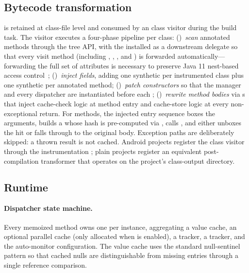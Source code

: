 \subsection{Bytecode transformation}\label{sec:transform}

 is retained at class-file level and consumed by an \asm class visitor during the  build task. The visitor executes a four-phase pipeline per class: ()~\emph{scan} annotated methods through the \asm tree API, with the  installed as a downstream delegate so that every visit method (including , , , and ) is forwarded automatically---forwarding the full set of attributes is necessary to preserve Java 11 nest-based access control~\cite{jep181}; ()~\emph{inject fields}, adding one synthetic  per instrumented class plus one synthetic  per annotated method; ()~\emph{patch constructors} so that the manager and every dispatcher are instantiated before each ; ()~\emph{rewrite method bodies} via s that inject cache-check logic at method entry and cache-store logic at every non-exceptional return. For  methods, the injected entry sequence boxes the arguments, builds a  whose hash is pre-computed via , calls , and either unboxes the hit or falls through to the original body. Exception paths are deliberately skipped: a thrown result is not cached. Android projects register the class visitor through the \agp instrumentation \api; plain \jvm projects register an equivalent post-compilation transformer that operates on the project's class-output directory.

\subsection{Runtime}\label{sec:runtime}

\paragraph{Dispatcher state machine.} Every memoized method owns one  per instance, aggregating a value cache, an optional parallel  cache (only allocated when \ttl is enabled), a  tracker, a  tracker, and the auto-monitor configuration. The value cache uses the standard null-sentinel pattern so that cached nulls are distinguishable from missing entries through a single reference comparison.


